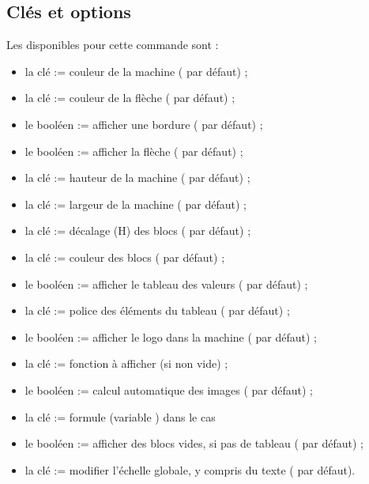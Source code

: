 \begin{PresCodeTexPL}{}
\end{PresCodeTexPL}

\begin{PresCodeTexPL}{}
\end{PresCodeTexPL}

\subsection{Clés et options}

\begin{cautionblock}
Les  disponibles pour cette commande sont :

\begin{itemize}
	\item la clé  := couleur de la machine ( par défaut) ;
	\item la clé  := couleur de la flèche ( par défaut) ;
	\item le booléen  := afficher une bordure ( par défaut) ;
	\item le booléen  := afficher la flèche ( par défaut) ;
	\item la clé  := hauteur de la machine ( par défaut) ;
	\item la clé  := largeur de la machine ( par défaut) ;
	\item la clé  := décalage (H) des blocs (\Cle{4pt} par défaut) ;
	\item la clé  := couleur des blocs ( par défaut) ;
	\item le booléen  := afficher le tableau des valeurs ( par défaut) ;
	\item la clé  := police des éléments du tableau ( par défaut) ;
	\item le booléen  := afficher le logo dans la machine ( par défaut) ;
	\item la clé  := fonction à afficher (si non vide) ;
	\item le booléen  := calcul automatique des images ( par défaut) ;
	\item la clé  := formule (variable ) dans le cas 
	\item le booléen  := afficher des blocs vides, si pas de tableau ( par défaut) ;
	\item la clé  := modifier l'échelle globale, y compris du texte ( par défaut).
\end{itemize}


\end{cautionblock}
